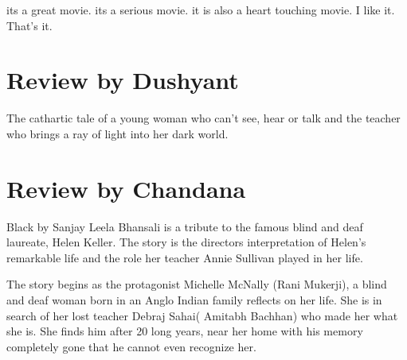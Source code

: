 \documentclass{article}
\begin{document}
its a great movie. its a serious movie. it is also a heart touching movie. I like it. That's it.

\section{Review by Dushyant}
The cathartic tale of a young woman who can't see, hear or talk and the teacher who brings a ray of light into her dark world.


\section{Review by Chandana}
Black by Sanjay Leela Bhansali is a tribute to the famous blind and deaf laureate, Helen Keller. The story is the directors interpretation of Helen's remarkable life and the role her teacher Annie Sullivan played in her life.
\par
The story begins as the protagonist Michelle McNally (Rani Mukerji), a blind and deaf woman born in an Anglo Indian family reflects on her life. She is in search of her lost teacher Debraj Sahai( Amitabh Bachhan) who made her what she is. She finds him after 20 long years, near her home with his memory completely gone that he cannot even recognize her.
\end{document}
